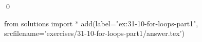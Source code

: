 
\begin{ex}
  \label{ex:31-10-for-loops-part1}
  
  \qed
\end{ex}
\begin{python0}
from solutions import *
add(label="ex:31-10-for-loops-part1",
    srcfilename='exercises/31-10-for-loops-part1/answer.tex')
\end{python0}
